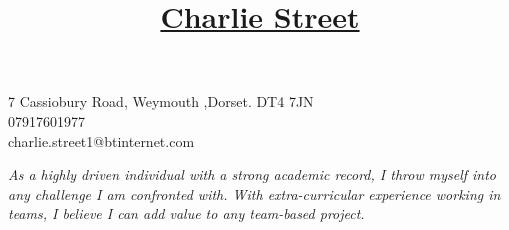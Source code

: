 \documentclass[11pt]{article}
\title{\vspace{-80pt}\underline{Charlie Street}}
\date{}
\begin{document}
	\maketitle
	\vspace*{-60pt}
	\begin{flushleft}
		\noindent
		\large7 Cassiobury Road, Weymouth ,Dorset. DT4 7JN\\                             
		\large 07917601977\\
          		 \large charlie.street1@btinternet.com
	\end{flushleft}
	

	\vspace{-15pt}
	\begin{center}
			\textit{\large As a highly driven individual with a strong academic record, I throw myself into any challenge I am confronted with. With extra-curricular experience working in teams, I believe I can add value to any team-based project.}
	\end{center}
			
\end{document}
